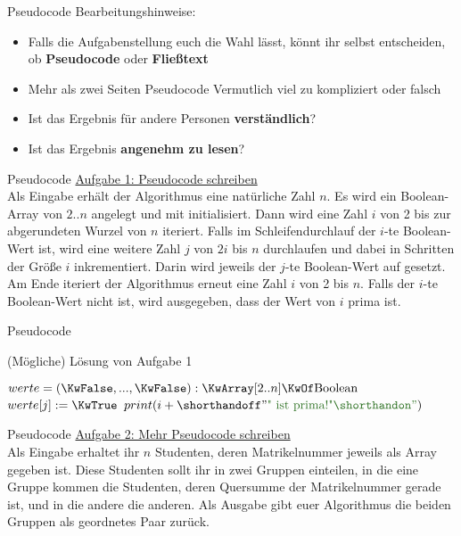 \begin{frame}{Pseudocode}
	Bearbeitungshinweise: \\
	\begin{itemize}
		\pause
		\item Falls die Aufgabenstellung euch die Wahl lässt, könnt ihr selbst entscheiden, ob \textbf{Pseudocode} oder \textbf{Fließtext}
		\pause
		\item Mehr als zwei Seiten Pseudocode \impl Vermutlich viel zu kompliziert oder falsch
		\pause
		\item Ist das Ergebnis für andere Personen \textbf{verständlich}?
		\pause
		\item Ist das Ergebnis \textbf{angenehm zu lesen}?
	\end{itemize}
\end{frame}


\begin{frame}{Pseudocode}
	\underline{Aufgabe 1: Pseudocode schreiben} \\
	Als Eingabe erhält der Algorithmus eine natürliche Zahl $n$. Es wird ein  Boolean-Array von $2..n$ angelegt und mit \KwFalse initialisiert. Dann wird eine Zahl $i$ von 2 bis zur abgerundeten Wurzel von $n$ iteriert. Falls im Schleifendurchlauf der $i$-te Boolean-Wert \KwFalse ist, wird eine weitere Zahl $j$ von $2i$ bis $n$ durchlaufen und dabei in Schritten der Größe $i$ inkrementiert. Darin wird jeweils der $j$-te Boolean-Wert auf \KwTrue gesetzt. \\
	Am Ende iteriert der Algorithmus erneut eine Zahl $i$ von 2 bis $n$. Falls der $i$-te Boolean-Wert nicht \KwTrue ist, wird ausgegeben, dass der Wert von $i$ prima ist.
\end{frame}


\begin{frame}{Pseudocode}
	\begin{exampleblock}{(Mögliche) Lösung von Aufgabe 1}
		\begin{algorithm}[H]
			$werte = (\KwFalse,...,\KwFalse) : \KwArray[2..n] \KwOf \|Boolean|$\;
			 {
				 {
					 {
						$werte[j] := \KwTrue$\;
					}
				}
			}
			 {
				 {
					$print(i + \str{ ist prima!})$\;
				}
			}
		\end{algorithm}
	\end{exampleblock}
\end{frame}


\begin{frame}{Pseudocode}
	\underline{Aufgabe 2: Mehr Pseudocode schreiben} \\
	Als Eingabe erhaltet ihr $n$ Studenten, deren Matrikelnummer jeweils als Array gegeben ist. Diese Studenten sollt ihr in zwei Gruppen einteilen, in die eine Gruppe kommen die Studenten, deren Quersumme der Matrikelnummer gerade ist, und in die andere die anderen.
	Als Ausgabe gibt euer Algorithmus die beiden Gruppen als geordnetes Paar zurück.
\end{frame}

